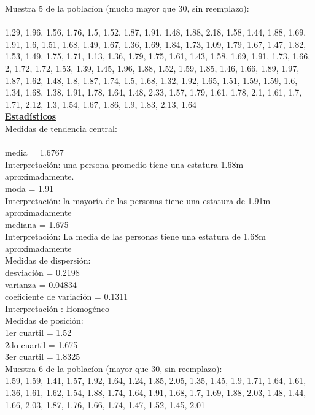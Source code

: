 \documentclass[a4paper,12pt]{article}
\begin{document}
\begin{enumerate}
Muestra 5 de la poblac\'ion (mucho mayor que 30, sin reemplazo): \\\\
1.29,	1.96,	1.56,	1.76,	1.5,    1.52,
1.87,	1.91,	1.48,	1.88,	2.18,	1.58,
1.44,	1.88,	1.69,	1.91,	1.6,    1.51,
1.68,	1.49,	1.67,	1.36,	1.69,	1.84,
1.73,	1.09,	1.79,	1.67,	1.47,	1.82,
1.53,	1.49,	1.75,	1.71,	1.13,	1.36,
1.79,	1.75,	1.61,	1.43,	1.58,	1.69,
1.91,	1.73,	1.66,	2,      1.72,	1.72,
1.53,	1.39,	1.45,	1.96,	1.88,	1.52,
1.59,	1.85,	1.46,	1.66,	1.89,	1.97,
1.87,	1.62,	1.48,	1.8,    1.87,	1.74,
1.5,    1.68,	1.32,	1.92,	1.65,	1.51,
1.59,	1.59,	1.6,    1.34,	1.68,	1.38,
1.91,	1.78,	1.64,	1.48,	2.33,	1.57,
1.79,	1.61,	1.78,	2.1,    1.61,	1.7,
1.71,	2.12,	1.3,    1.54,	1.67,	1.86,
1.9,    1.83,	2.13,	1.64\\

\textbf{\underline{Estad\'isticos}}\\

Medidas de tendencia central:\\\\
media = 1.6767\\
Interpretaci\'on: una persona promedio tiene una estatura 1.68m aproximadamente.\\
moda = 1.91\\
Interpretaci\'on: la mayor\'ia de las personas tiene una estatura de 1.91m aproximadamente\\
mediana =  1.675\\
Interpretaci\'on: La media de las personas tiene una estatura de 1.68m aproximadamente\\

Medidas de dispersi\'on:\\
desviaci\'on = 0.2198\\
varianza = 0.04834\\
coeficiente de variaci\'on = 0.1311\\
Interpretaci\'on : Homog\'eneo\\

Medidas de posici\'on:\\
1er cuartil = 1.52\\
2do cuartil = 1.675\\
3er cuartil = 1.8325\\

Muestra 6 de la poblac\'ion (mayor que 30, sin reemplazo): \\

1.59,	1.59,	1.41,	1.57,	1.92,	1.64,
1.24,	1.85,	2.05,	1.35,	1.45,	1.9,
1.71,	1.64,	1.61,	1.36,	1.61,	1.62,
1.54,	1.88,	1.74,	1.64,	1.91,	1.68,
1.7,    1.69,	1.88,	2.03,	1.48,	1.44,
1.66,	2.03,	1.87,	1.76,	1.66,	1.74,
1.47,	1.52,	1.45,	2.01\\


\end{enumerate}
\end{document}
